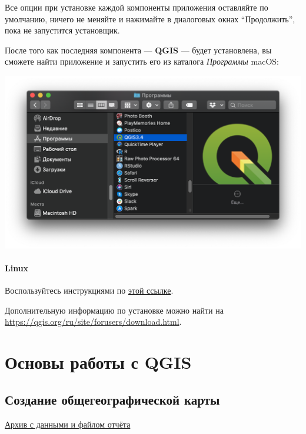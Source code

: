 \documentclass[
  12pt,
]{book}
\begin{document}
Все опции при установке каждой компоненты приложения оставляйте по умолчанию, ничего не меняйте и нажимайте в диалоговых окнах ``Продолжить'', пока не запустится установщик.

После того как последняя компонента --- \textbf{QGIS} --- будет установлена, вы сможете найти приложение и запустить его из каталога \emph{Программы} macOS:

\includegraphics{images/installation_instruction_mac/mac05.png}

\hypertarget{linux}{%
\subsection*{Linux}\label{linux}}

Воспользуйтесь инструкциями по \href{https://qgis.org/ru/site/forusers/alldownloads.html\#linux}{этой ссылке}.

Дополнительную информацию по установке можно найти на \url{https://qgis.org/ru/site/forusers/download.html}.

\hypertarget{part-ux43eux441ux43dux43eux432ux44b-ux440ux430ux431ux43eux442ux44b-ux441-qgis}{%
\part{Основы работы с QGIS}\label{part-ux43eux441ux43dux43eux432ux44b-ux440ux430ux431ux43eux442ux44b-ux441-qgis}}

\hypertarget{map-design-general}{%
\chapter{Создание общегеографической карты}\label{map-design-general}}

\href{https://1drv.ms/u/s!AmtmZDq3JgxHgZUGIl2IXikh_JmrhA?e=NdRmIe}{Архив с данными и файлом отчёта}
\end{document}
